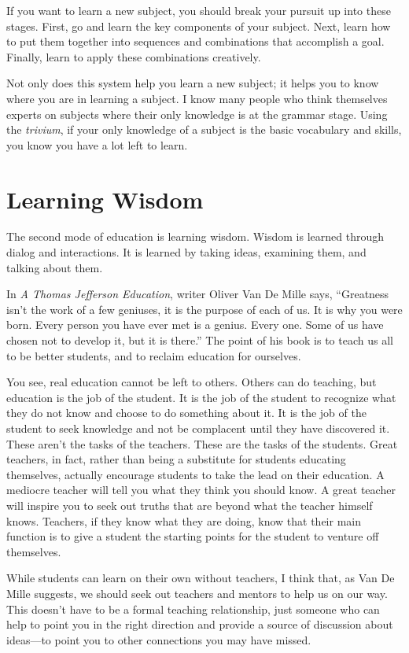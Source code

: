 If you want to learn a new subject, you should break your pursuit up
into these stages. First, go and learn the key components of your
subject. Next, learn how to put them together into sequences and
combinations that accomplish a goal. Finally, learn to apply these
combinations creatively.

Not only does this system help you learn a new subject; it helps you to
know where you are in learning a subject. I know many people who think
themselves experts on subjects where their only knowledge is at the
grammar stage. Using the \textit{trivium}, if your only knowledge of a
subject is the basic vocabulary and skills, you know you have a lot
left to learn. 

\section{Learning Wisdom}

The second mode of education is learning wisdom. Wisdom is learned
through dialog and interactions. It is learned by taking ideas,
examining them, and talking about them. 

In \textit{A Thomas Jefferson Education}, writer Oliver Van De Mille
says, “Greatness isn’t the work of a few geniuses, it is the purpose of
each of us. It is why you were born. Every person you have ever met is
a genius. Every one. Some of us have chosen not to develop it, but it
is there.”  The point of his book is to teach us all to be better
students, and to reclaim education for ourselves.

You see, real education cannot be left to others. Others can do
teaching, but education is the job of the student. It is the job of the
student to recognize what they do not know and choose to do something
about it. It is the job of the student to seek knowledge and not be
complacent until they have discovered it. These aren’t the tasks of the
teachers. These are the tasks of the students. Great teachers, in fact,
rather than being a substitute for students educating themselves,
actually encourage students to take the lead on their education. A
mediocre teacher will tell you what they think you should know. A great
teacher will inspire you to seek out truths that are beyond what the
teacher himself knows. Teachers, if they know what they are doing, know
that their main function is to give a student the starting points for
the student to venture off themselves.

While students can learn on their own without teachers, I think that, as
Van De Mille suggests, we should seek out teachers and mentors to help
us on our way. This doesn’t have to be a formal teaching relationship,
just someone who can help to point you in the right direction and
provide a source of discussion about ideas—to point you to other
connections you may have missed.

